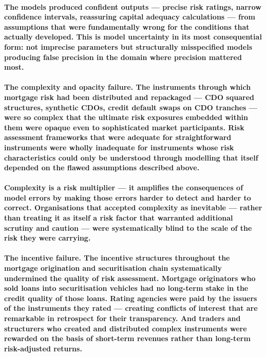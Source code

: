 \paragraph{The models produced confident outputs — precise risk ratings, narrow confidence intervals, reassuring capital adequacy calculations — from assumptions that were fundamentally wrong for the conditions that actually developed. This is model uncertainty in its most consequential form: not imprecise parameters but structurally misspecified models producing false precision in the domain where precision mattered most.}
\paragraph{\textbf{The complexity and opacity failure}. The instruments through which mortgage risk had been distributed and repackaged — CDO squared structures, synthetic CDOs, credit default swaps on CDO tranches — were so complex that the ultimate risk exposures embedded within them were opaque even to sophisticated market participants. Risk assessment frameworks that were adequate for straightforward instruments were wholly inadequate for instruments whose risk characteristics could only be understood through modelling that itself depended on the flawed assumptions described above.}
\paragraph{Complexity is a risk multiplier — it amplifies the consequences of model errors by making those errors harder to detect and harder to correct. Organisations that accepted complexity as inevitable — rather than treating it as itself a risk factor that warranted additional scrutiny and caution — were systematically blind to the scale of the risk they were carrying.}
\paragraph{\textbf{The incentive failure}. The incentive structures throughout the mortgage origination and securitisation chain systematically undermined the quality of risk assessment. Mortgage originators who sold loans into securitisation vehicles had no long-term stake in the credit quality of those loans. Rating agencies were paid by the issuers of the instruments they rated — creating conflicts of interest that are remarkable in retrospect for their transparency. And traders and structurers who created and distributed complex instruments were rewarded on the basis of short-term revenues rather than long-term risk-adjusted returns.}
